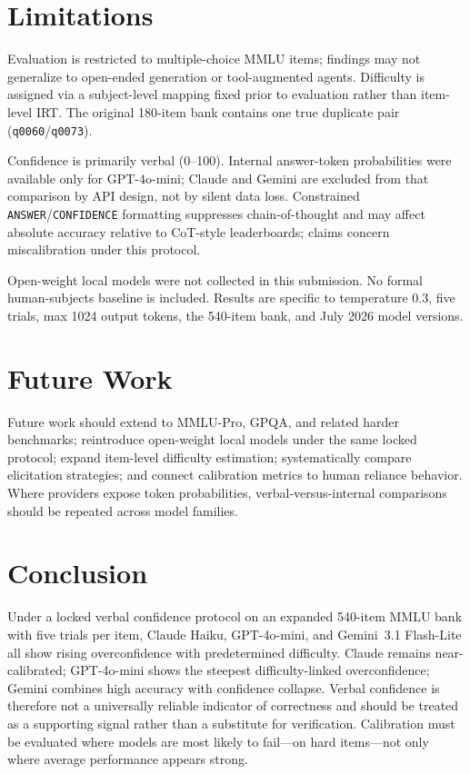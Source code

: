 \documentclass[twoside,twocolumn,10pt]{article}
\begin{document}
\section{Limitations}

Evaluation is restricted to multiple-choice MMLU items; findings may not generalize to open-ended generation or tool-augmented agents. Difficulty is assigned via a subject-level mapping fixed prior to evaluation rather than item-level IRT. The original 180-item bank contains one true duplicate pair (\texttt{q0060}/\texttt{q0073}).

Confidence is primarily verbal (0--100). Internal answer-token probabilities were available only for GPT-4o-mini; Claude and Gemini are excluded from that comparison by API design, not by silent data loss. Constrained \texttt{ANSWER}/\texttt{CONFIDENCE} formatting suppresses chain-of-thought and may affect absolute accuracy relative to CoT-style leaderboards; claims concern miscalibration under this protocol.

Open-weight local models were not collected in this submission. No formal human-subjects baseline is included. Results are specific to temperature 0.3, five trials, max 1024 output tokens, the 540-item bank, and July 2026 model versions.

\section{Future Work}

Future work should extend to MMLU-Pro, GPQA, and related harder benchmarks; reintroduce open-weight local models under the same locked protocol; expand item-level difficulty estimation; systematically compare elicitation strategies; and connect calibration metrics to human reliance behavior. Where providers expose token probabilities, verbal-versus-internal comparisons should be repeated across model families.

\section{Conclusion}

Under a locked verbal confidence protocol on an expanded 540-item MMLU bank with five trials per item, Claude Haiku, GPT-4o-mini, and Gemini~3.1 Flash-Lite all show rising overconfidence with predetermined difficulty. Claude remains near-calibrated; GPT-4o-mini shows the steepest difficulty-linked overconfidence; Gemini combines high accuracy with confidence collapse. Verbal confidence is therefore not a universally reliable indicator of correctness and should be treated as a supporting signal rather than a substitute for verification. Calibration must be evaluated where models are most likely to fail---on hard items---not only where average performance appears strong.
\end{document}
